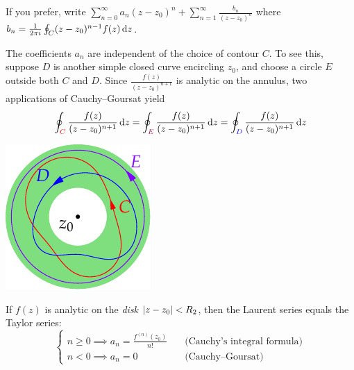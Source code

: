 \begin{itemize}
  \item If you prefer, write $\sum\limits_{n=0}^\infty a_n(z-z_0)^n+\sum\limits_{n=1}^\infty \frac{b_n}{(z-z_0)^n}$ where $b_n=\frac 1{2\pi i}\oint_C(z-z_0)^{n-1}f(z)\,{\mathrm{d} z}$.\par
  \begin{minipage}[t]{0.73\linewidth}\vspace{0pt}
		\item The coefficients $a_n$ are independent of the choice of contour $C$.\smallbreak
		To see this, suppose $D$ is another simple closed curve encircling $z_0$, and choose a circle $E$ outside both $C$ and $D$. Since $\frac{f(z)}{(z-z_0)^{n+1}}$ is analytic on the annulus, two applications of Cauchy--Goursat yield
	  \[
	  	\oint_{\textcolor{red}{C}}\frac{f(z)}{(z-z_0)^{n+1}}\,{\mathrm{d} z}
	  	=\oint_{\textcolor{purple}{E}}\frac{f(z)}{(z-z_0)^{n+1}}\,{\mathrm{d} z}
	  	=\oint_{\textcolor{blue}{D}}\frac{f(z)}{(z-z_0)^{n+1}}\,{\mathrm{d} z}
	  \]
	\end{minipage}
	\hfill
	\begin{minipage}[t]{0.26\linewidth}\vspace{-5pt}
		\flushright\includegraphics[scale=0.95]{laurent3}
	\end{minipage}\par
  
  \item If $f(z)$ is analytic on the \emph{disk} $\left| z-z_0\right|<R_2$, then the Laurent series equals the Taylor series:
	\[
		\begin{cases}
			n\ge 0\implies a_n=\frac{f^{(n)}(z_0)}{n!} \quad &\text{(Cauchy's integral formula)}\\
			n<0\implies a_n=0 \quad &\text{(Cauchy--Goursat)}
		\end{cases}
	\]
\end{itemize}

